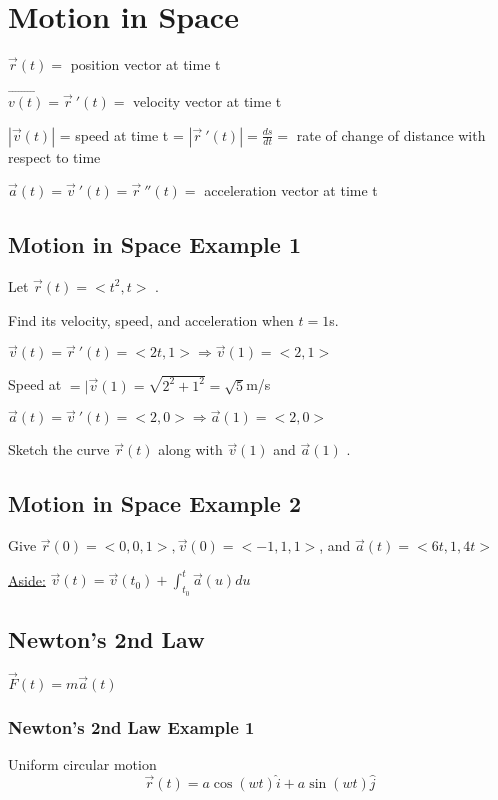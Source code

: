 \documentclass[12pt]{article}
\begin{document}
\section{Motion in Space}

\(\vec{r} (t) =  \) position vector at time t

\(\vec{v(t)} = \vec{r}\ '(t) =  \) velocity vector at time t

\(|\vec{v} (t)| \) = speed at time t = \(|\vec{r}\ '(t)| = \frac{ds}{dt} = \) rate of change of distance with respect to time 

\(\vec{a} (t) = \vec{v}\ '(t) = \vec{r}\ ''(t)= \) acceleration vector at time t

\subsection{Motion in Space Example 1}
Let \(\vec{r} (t) = <t^2,t> \) .

Find its velocity, speed, and acceleration when \(t=1\)s.

\(\vec{v} (t) = \vec{r}\ '(t) = <2t,1> \Rightarrow \vec{v} (1) = <2,1>  \) 

Speed at \(=|\vec{v} (1) = \sqrt{2^2+1^2} = \sqrt{5} \)m/s 

\(\vec{a} (t) = \vec{v}\ '(t) = <2,0> \Rightarrow \vec{a}(1) = <2,0>   \) 

Sketch the curve \(\vec{r} (t) \) along with \(\vec{v} (1) \) and \(\vec{a} (1)   \) .

\subsection{Motion in Space Example 2}
Give \(\vec{r} (0) = <0,0,1>, \vec{v}(0) = <-1,1,1>   \), and \(\vec{a} (t) = <6t,1,4t> \)    

\underline{Aside:} \(\vec{v} (t) = \vec{v} (t_0) + \int_{t_0}^{t}\vec{a} (u)  du
  \) 

\subsection{Newton's 2nd Law}
\( \vec{F} (t) = m \vec{a} (t)\)  

\subsubsection{Newton's 2nd Law Example 1}
Uniform circular motion
\[
	\vec{r} (t) = a\cos(wt)\hat{i} + a\sin(wt)\hat{j} 
\]
\end{document}
